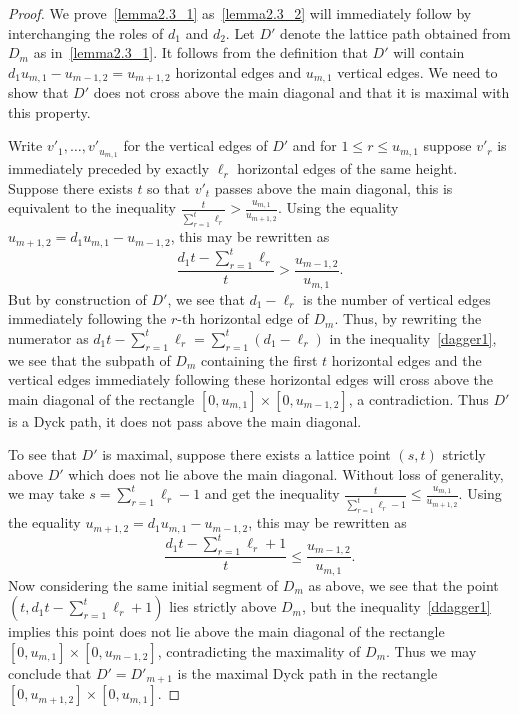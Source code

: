\begin{proof}
 We prove~\ref{lemma2.3_1} as~\ref{lemma2.3_2} will immediately follow by interchanging the roles of $d_1$ and $d_2$. 
 Let $D'$ denote the lattice path obtained from $D_m$ as in~\ref{lemma2.3_1}. 
 It follows from the definition that $D'$ will contain $d_1u_{m,1}-u_{m-1,2}=u_{m+1,2}$ horizontal edges and $u_{m,1}$ vertical edges. 
 We need to show that $D'$ does not cross above the main diagonal and that it is maximal with this property. 

 Write $v'_1,\ldots,v'_{u_{m,1}}$ for the vertical edges of $D'$ and for $1\le r\le u_{m,1}$ suppose $v'_r$ is immediately preceded by exactly $\ell_r$ horizontal edges of the same height.
 Suppose there exists $t$ so that $v'_t$ passes above the main diagonal, this is equivalent to the inequality $\frac{t}{\sum\limits_{r=1}^t\ell_r}>\frac{u_{m,1}}{u_{m+1,2}}$. 
 Using the equality $u_{m+1,2}=d_1u_{m,1}-u_{m-1,2}$, this may be rewritten as 
 \begin{equation}\label{dagger1}
 \tag{$\dagger$}\frac{d_1t-\sum\limits_{r=1}^t\ell_r}{t}>\frac{u_{m-1,2}}{u_{m,1}}.
 \end{equation}
 But by construction of $D'$, we see that $d_1-\ell_r$ is the number of vertical edges immediately following the $r$-th horizontal edge of $D_m$. 
 Thus, by rewriting the numerator as $d_1t-\sum\limits_{r=1}^t\ell_r=\sum\limits_{r=1}^t(d_1-\ell_r)$ in the inequality~\eqref{dagger1}, we see that the subpath of $D_m$ containing the first $t$ horizontal edges and the vertical edges immediately following these horizontal edges will cross above the main diagonal of the rectangle $[0,u_{m,1}]\times[0,u_{m-1,2}]$, a contradiction. 
 Thus $D'$ is a Dyck path, \ie it does not pass above the main diagonal.

 To see that $D'$ is maximal, suppose there exists a lattice point $(s,t)$ strictly above $D'$ which does not lie above the main diagonal. 
 Without loss of generality, we may take $s=\sum\limits_{r=1}^t\ell_r-1$ and get the inequality $\frac{t}{\sum\limits_{r=1}^t\ell_r-1}\le\frac{u_{m,1}}{u_{m+1,2}}$. 
 Using the equality $u_{m+1,2}=d_1u_{m,1}-u_{m-1,2}$, this may be rewritten as
 \begin{equation}\label{ddagger1}
 \tag{$\ddagger$}\frac{d_1t-\sum\limits_{r=1}^t\ell_r+1}{t}\le\frac{u_{m-1,2}}{u_{m,1}}.
 \end{equation}
 Now considering the same initial segment of $D_m$ as above, we see that the point $(t,d_1t-\sum\limits_{r=1}^t\ell_r+1)$ lies strictly above $D_m$, but the inequality~\eqref{ddagger1} implies this point does not lie above the main diagonal of the rectangle $[0,u_{m,1}]\times[0,u_{m-1,2}]$, contradicting the maximality of $D_m$. 
 Thus we may conclude that $D'=D'_{m+1}$ is the maximal Dyck path in the rectangle $[0,u_{m+1,2}]\times[0,u_{m,1}]$.
\end{proof}

